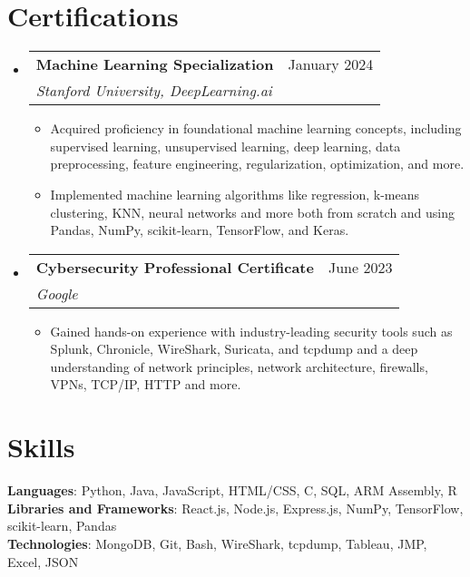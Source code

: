 \documentclass[letterpaper,11pt]{article}
\makeatletter
\newcommand{\resumeItem}[1]{
  \item\small{
    {#1 \vspace{-2pt}}
  }
}
\newcommand{\resumeSubheading}[4]{
  \vspace{-2pt}\item
    \begin{tabular*}{0.97\textwidth}[t]{l@{\extracolsep{\fill}}r}
      \textbf{#1} & #2 \\
      \textit{\small#3} & \textit{\small #4} \\
    \end{tabular*}\vspace{-7pt}
}
\newcommand{\resumeSubHeadingListStart}{\begin{itemize}[leftmargin=0.15in, label={}]}
\newcommand{\resumeSubHeadingListEnd}{\end{itemize}}
\newcommand{\resumeItemListStart}{\begin{itemize}}
\newcommand{\resumeItemListEnd}{\end{itemize}\vspace{-5pt}}
\makeatother
\begin{document}
\section{Certifications}
\resumeSubHeadingListStart
    \resumeSubheading
        {Machine Learning Specialization}{January 2024}
        {Stanford University, DeepLearning.ai}{}
        \resumeItemListStart
            \resumeItem{Acquired proficiency in foundational machine learning concepts, including supervised learning, unsupervised learning, deep learning, data preprocessing, feature engineering, regularization, optimization, and more.}
            \resumeItem{Implemented machine learning algorithms like regression, k-means clustering, KNN, neural networks and more both from scratch and using Pandas, NumPy, scikit-learn, TensorFlow, and Keras.}
        \resumeItemListEnd

    \resumeSubheading
        {Cybersecurity Professional Certificate}{June 2023}
        {Google}{}
        \resumeItemListStart
            \resumeItem{Gained hands-on experience with industry-leading security tools such as Splunk, Chronicle, WireShark, Suricata, and tcpdump and a deep understanding of network principles, network architecture, firewalls, VPNs, TCP/IP, HTTP and more.}
        \resumeItemListEnd
\resumeSubHeadingListEnd



\section{Skills}
 \begin{itemize}[leftmargin=0.15in, label={}]
    \small{\item{
     \textbf{Languages}{: Python, Java, JavaScript, HTML/CSS, C, SQL, ARM Assembly, R} \\
     \textbf{Libraries and Frameworks}{: React.js, Node.js, Express.js, NumPy, TensorFlow, scikit-learn, Pandas} \\
     \textbf{Technologies}{: MongoDB, Git, Bash, WireShark, tcpdump, Tableau, JMP, Excel, JSON}
    }}
 \end{itemize}


\end{document}
